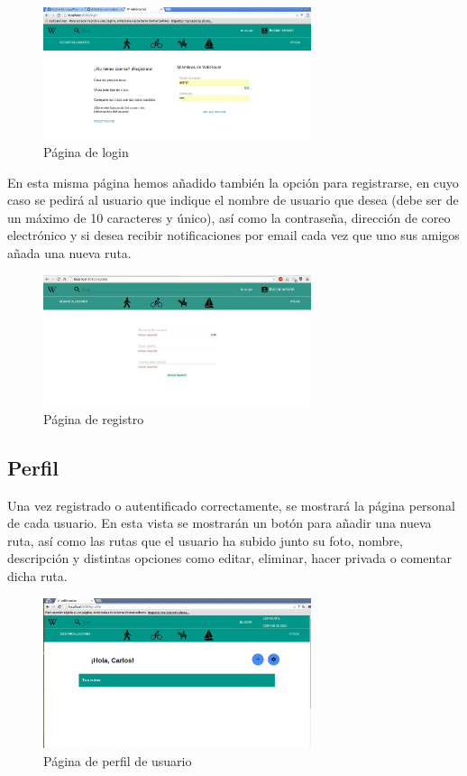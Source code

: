 \documentclass[11pt,a4paper]{article}
\begin{document}
\begin{figure}[h]
\centering
  \includegraphics[width=0.7\textwidth]{./imagenes/login}
  \caption{Página de login}
  \label{fig: Página de login}
\end{figure}
En esta misma página hemos añadido también la opción para registrarse, en cuyo caso se pedirá al usuario que indique el nombre de usuario que desea (debe ser de un máximo de 10 caracteres y único), así como la contraseña, dirección de coreo electrónico y si desea recibir notificaciones por email cada vez que uno sus amigos añada una nueva ruta.\\


\begin{figure}[h]
\centering
  \includegraphics[width=0.7\textwidth]{./imagenes/registro}
  \caption{Página de registro}
  \label{fig: Página de registro}
\end{figure}
\clearpage
\subsection{Perfil}
Una vez registrado o autentificado correctamente, se mostrará  la página personal de cada usuario. En esta vista se mostrarán un botón para añadir una nueva ruta, así como las rutas que el usuario ha subido junto su foto, nombre, descripción y distintas opciones como editar, eliminar, hacer privada o comentar dicha ruta. 
\begin{figure}[h]
\centering
  \includegraphics[width=0.7\textwidth]{./imagenes/perfil}
  \caption{Página de perfil de usuario}
  \label{fig: Página de perfil de usuario}
\end{figure}
\end{document}
